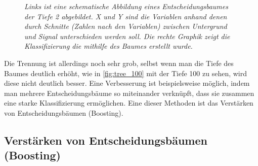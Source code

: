 \begin{figure}[hhh]
\centering     %
{}
\caption{\it Links ist eine schematische Abbildung eines Entscheidungsbaumes der Tiefe 2 abgebildet. X und Y sind die Variablen anhand denen durch Schnitte (Zahlen nach den Variablen) zwischen Untergrund und Signal unterschieden werden soll. Die rechte Graphik zeigt die Klassifizierung die mithilfe des Baumes erstellt wurde.}
\end{figure}

Die Trennung ist allerdings noch sehr grob, selbst wenn man die Tiefe des Baumes deutlich erh\"oht, wie in \ref{fig:tree_100} mit der Tiefe 100 zu sehen, wird diese nicht deutlich besser. Eine Verbesserung ist beispielsweise m\"oglich, indem man mehrere Entscheidungsb\"aume so miteinander verkn\"upft, dass sie zusammen eine starke Klassifizierung erm\"oglichen. Eine dieser Methoden ist das Verst\"arken von Entscheidungsb\"aumen (Boosting).





\subsection{Verst\"arken von Entscheidungsb\"aumen (Boosting)}
\label{ch:Algorithmen:subsec:Boosting}

